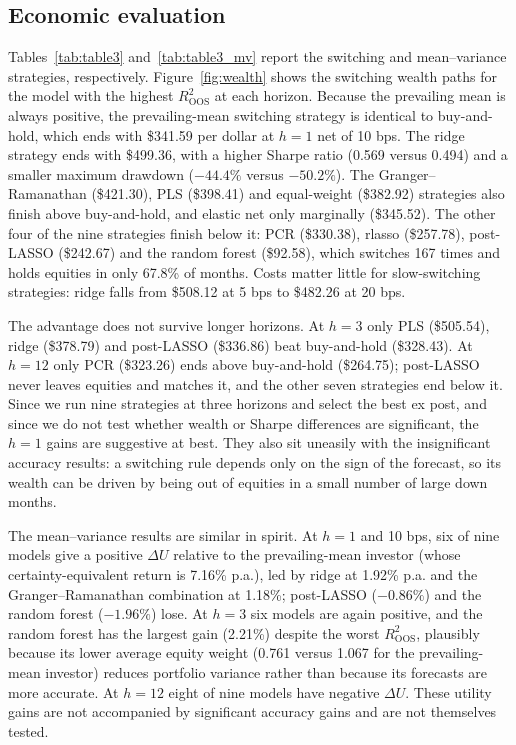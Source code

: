 \documentclass[11pt,a4paper]{article}
\begin{document}
\subsection{Economic evaluation}\label{sec:results:econ}
Tables~\ref{tab:table3} and~\ref{tab:table3_mv} report the switching and
mean--variance strategies, respectively. Figure~\ref{fig:wealth} shows
the switching wealth paths for the model with the highest
$R^2_{\mathrm{OOS}}$ at each horizon. Because the prevailing mean is
always positive, the prevailing-mean switching strategy is identical to
buy-and-hold, which ends with \$341.59 per dollar at $h=1$ net of 10 bps.
The ridge strategy ends with \$499.36, with a higher Sharpe ratio (0.569
versus 0.494) and a smaller maximum drawdown ($-44.4\%$ versus $-50.2\%$).
The Granger--Ramanathan (\$421.30), PLS (\$398.41) and equal-weight
(\$382.92) strategies also finish above buy-and-hold, and elastic net only
marginally (\$345.52). The other four of the nine strategies finish below
it: PCR (\$330.38), rlasso (\$257.78), post-LASSO (\$242.67) and the random
forest (\$92.58), which switches 167 times and holds equities in only 67.8\%
of months. Costs matter little for slow-switching strategies: ridge falls
from \$508.12 at 5 bps to \$482.26 at 20 bps.

The advantage does not survive longer horizons. At $h=3$ only PLS
(\$505.54), ridge (\$378.79) and post-LASSO (\$336.86) beat buy-and-hold
(\$328.43). At $h=12$ only PCR (\$323.26) ends above buy-and-hold (\$264.75);
post-LASSO never leaves equities and matches it, and the other seven
strategies end below it. Since we run nine strategies at three horizons and
select the best ex post, and since we do not test whether wealth or Sharpe
differences are significant, the $h=1$ gains are suggestive at best. They
also sit uneasily with the insignificant accuracy results: a switching rule
depends only on the sign of the forecast, so its wealth can be driven by
being out of equities in a small number of large down months.

The mean--variance results are similar in spirit. At $h=1$ and 10 bps,
six of nine models give a positive $\Delta U$ relative to the
prevailing-mean investor (whose certainty-equivalent return is 7.16\% p.a.),
led by ridge at 1.92\% p.a. and the Granger--Ramanathan combination at
1.18\%; post-LASSO ($-0.86\%$) and the random forest ($-1.96\%$) lose. At
$h=3$ six models are again positive, and the random forest has the largest
gain (2.21\%) despite the worst $R^2_{\mathrm{OOS}}$, plausibly because
its lower average equity weight (0.761 versus 1.067 for the
prevailing-mean investor) reduces portfolio variance rather than because
its forecasts are more accurate. At
$h=12$ eight of nine models have negative $\Delta U$. These utility gains
are not accompanied by significant accuracy gains and are not themselves
tested.
\end{document}

